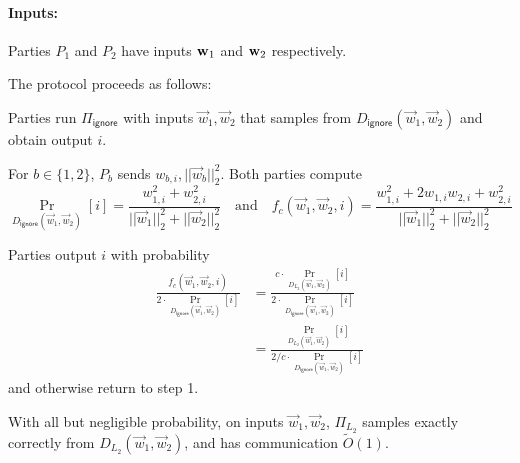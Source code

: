 \begin{algorithm}[htbp]

\paragraph{Inputs:} Parties $P_1$ and $P_2$ have inputs $\mathbf{w}_1$ and $\mathbf{w}_2$
respectively. 

\medskip

The protocol proceeds as follows:
\BEN
    \item Parties run $\Pi_{\mathsf{ignore}}$ 
    with inputs $\vec{w}_1, \vec{w}_2$
    that samples from $D_{\mathsf{ignore}}(\vec{w}_1, \vec{w}_2)$ and obtain output $i$.
    
    \item For $b \in \{1, 2\}$, $P_b$ sends $w_{b,i}, ||\vec{w}_b||_2^2$.
    Both parties compute 
    \[
    \Pr_{D_{\mathsf{ignore}}(\vec{w}_1, \vec{w}_2)}[i] = \frac{w_{1,i}^2 + w_{2,i}^2}{||\vec{w}_1||_2^2 + ||\vec{w}_2||_2^2}
    \quad
    \mbox{and}
    \quad
    f_c(\vec{w}_1, \vec{w}_2, i) = \frac{w_{1,i}^2 + 2w_{1,i}w_{2,i} + w_{2,i}^2}{||\vec{w}_1||_2^2 + ||\vec{w}_2||_2^2}
    \]
    \item Parties output $i$ with probability 
    \begin{align*}
        \frac{f_c(\vec{w}_1, \vec{w}_2, i)}{2 \cdot \Pr_{D_{\mathsf{ignore}}(\vec{w}_1, \vec{w}_2)}[i]} &= \frac{c \cdot \Pr_{D_{L_2}(\vec{w}_1, \vec{w}_2)}[i]}{2 \cdot \Pr_{D_{\mathsf{ignore}}(\vec{w}_1, \vec{w}_2)}[i]}\\
        &= \frac{\Pr_{D_{L_2}(\vec{w}_1, \vec{w}_2)}[i]}{2/c \cdot \Pr_{D_{\mathsf{ignore}}(\vec{w}_1, \vec{w}_2)}[i]}
        \end{align*}
    and otherwise return to step 1.
    
\EEN
\caption{Protocol for exact $L_2$ sampling ($\Pi_{L_2}$)}
\label{fig:l2approx}
\end{algorithm}

\begin{lemma} \label{lem:insecure_L2_prot}
With all but negligible probability, on inputs $\vec{w}_1, \vec{w}_2$, $\Pi_{L_2}$ samples exactly correctly from $D_{L_2}(\vec{w}_1, \vec{w}_2)$, and has communication
$\tilde{O}(1)$.
\end{lemma}

